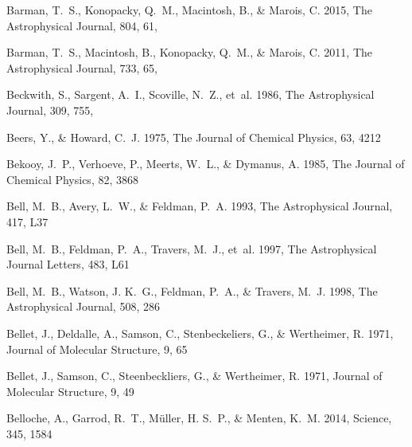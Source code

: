 \documentclass[twocolumn]{aastex631}
\begin{document}
\begin{thebibliography}{}
{Barman}, T.~S., {Konopacky}, Q.~M., {Macintosh}, B., \& {Marois}, C. 2015, The
  Astrophysical Journal, 804, 61, 

{Barman}, T.~S., {Macintosh}, B., {Konopacky}, Q.~M., \& {Marois}, C. 2011, The
  Astrophysical Journal, 733, 65, 

{Beckwith}, S., {Sargent}, A.~I., {Scoville}, N.~Z., {et~al.} 1986, The
  Astrophysical Journal, 309, 755, 

Beers, Y., \& Howard, C.~J. 1975, The Journal of Chemical Physics, 63, 4212

Bekooy, J.~P., Verhoeve, P., Meerts, W.~L., \& Dymanus, A. 1985, The Journal of
  Chemical Physics, 82, 3868

Bell, M.~B., Avery, L.~W., \& Feldman, P.~A. 1993, The Astrophysical Journal,
  417, L37

Bell, M.~B., Feldman, P.~A., Travers, M.~J., {et~al.} 1997, The Astrophysical
  Journal Letters, 483, L61

Bell, M.~B., Watson, J. K.~G., Feldman, P.~A., \& Travers, M.~J. 1998, The
  Astrophysical Journal, 508, 286

Bellet, J., Deldalle, A., Samson, C., Stenbeckeliers, G., \& Wertheimer, R.
  1971{}, Journal of Molecular Structure, 9, 65

Bellet, J., Samson, C., Steenbeckliers, G., \& Wertheimer, R.
  1971{}, Journal of Molecular Structure, 9, 49

Belloche, A., Garrod, R.~T., M{\"u}ller, H. S.~P., \& Menten, K.~M. 2014,
  Science, 345, 1584


\end{thebibliography}
\end{document}
